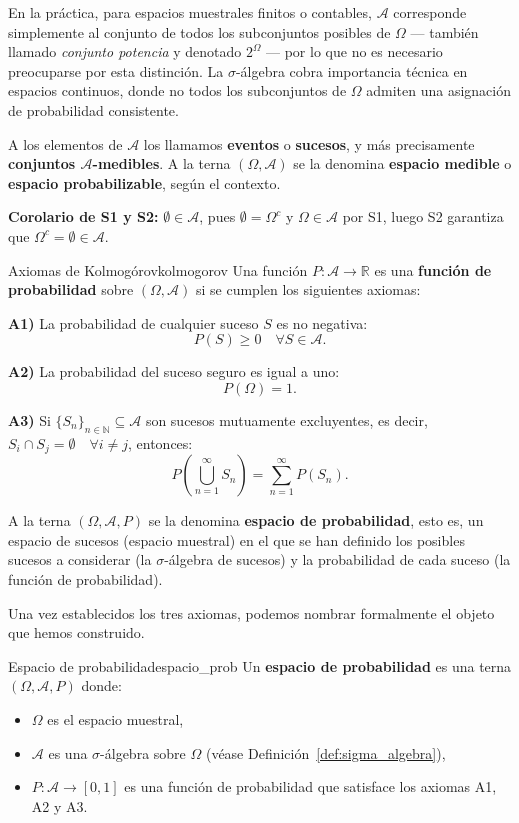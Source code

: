 \documentclass[12pt, a4paper]{book}
\numberwithin{equation}{chapter}
\begin{document}
En la práctica, para espacios muestrales finitos o contables, 
$\mathcal{A}$ corresponde simplemente al conjunto de todos los 
subconjuntos posibles de $\Omega$ — también llamado 
\textit{conjunto potencia} y denotado $2^\Omega$ — por lo que no es 
necesario preocuparse por esta distinción. La $\sigma$-álgebra cobra 
importancia técnica en espacios continuos, donde no todos los 
subconjuntos de $\Omega$ admiten una asignación de probabilidad 
consistente.

A los elementos de $\mathcal{A}$ los llamamos \textbf{eventos} o 
\textbf{sucesos}, y más precisamente \textbf{conjuntos 
	$\mathcal{A}$-medibles}. A la terna $(\Omega, \mathcal{A})$ se la 
denomina \textbf{espacio medible} o \textbf{espacio probabilizable}, 
según el contexto.

\medskip
\noindent\textbf{Corolario de S1 y S2:} $\emptyset \in \mathcal{A}$, 
pues $\emptyset = \Omega^c$ y $\Omega \in \mathcal{A}$ por S1, luego 
S2 garantiza que $\Omega^c = \emptyset \in \mathcal{A}$.

\begin{axioma}{Axiomas de Kolmog\'{o}rov}{kolmogorov}
	Una función $P : \mathcal{A} \longrightarrow \mathbb{R}$ es una \textbf{función de probabilidad} sobre $(\Omega, \mathcal{A})$ si se cumplen los siguientes axiomas:
	
	\medskip
	\noindent\textbf{A1)} La probabilidad de cualquier suceso $S$ es no negativa:
	\[
	P(S) \ge 0 \quad \forall S \in \mathcal{A}.
	\]
	
	\noindent\textbf{A2)} La probabilidad del suceso seguro es igual a uno:
	\[
	P(\Omega) = 1.
	\]
	
	\noindent\textbf{A3)} Si $\{S_n\}_{n \in \mathbb{N}} \subseteq \mathcal{A}$ son sucesos mutuamente excluyentes, es decir, $S_i \cap S_j = \emptyset \quad \forall i \neq j$, entonces:
	\[
	P\left(\bigcup_{n=1}^{\infty} S_n\right) = \sum_{n=1}^{\infty} P(S_n).
	\]
\end{axioma}

A la terna $(\Omega, \mathcal{A}, P)$ se la denomina \textbf{espacio de probabilidad}, esto es, un espacio de sucesos (espacio muestral) en el que se han definido los posibles sucesos a considerar (la $\sigma$-álgebra de sucesos) y la probabilidad de cada suceso (la función de probabilidad).

Una vez establecidos los tres axiomas, podemos nombrar formalmente el 
objeto que hemos construido.

\begin{definicion}{Espacio de probabilidad}{espacio_prob}
	Un \textbf{espacio de probabilidad} es una terna 
	$(\Omega, \mathcal{A}, P)$ donde:
	\begin{itemize}
		\item $\Omega$ es el espacio muestral,
		\item $\mathcal{A}$ es una $\sigma$-álgebra sobre $\Omega$ 
		(véase Definición~\ref{def:sigma_algebra}),
		\item $P : \mathcal{A} \to [0,1]$ es una función de 
		probabilidad que satisface los axiomas A1, A2 y A3.
	\end{itemize}
\end{definicion}
\end{document}
